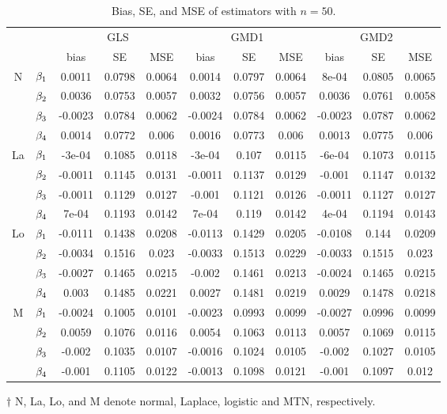 \begin{table}[htbp!]
\begin{center}
\begin{tabular}{c  c c c  c c c  c c c  c }
\hline
 &  & \multicolumn{3}{c}{GLS} & \multicolumn{3}{c}{GMD1} & \multicolumn{3}{c}{GMD2} \\
\cline{3-11}
 &  &  bias & SE & MSE & bias  & SE & MSE & bias & SE & MSE\\
\hline
\multirow{3}{*}{N}& $\beta_{1}$&0.0011  &0.0798 &0.0064 &0.0014  &0.0797 &0.0064 &8e-04   &0.0805 &0.0065 \\
& $\beta_{2}$&0.0036  &0.0753 &0.0057 &0.0032  &0.0756 &0.0057 &0.0036  &0.0761 &0.0058 \\
& $\beta_{3}$&-0.0023 &0.0784 &0.0062 &-0.0024 &0.0784 &0.0062 &-0.0023 &0.0787 &0.0062 \\
& $\beta_{4}$&0.0014  &0.0772 &0.006  &0.0016  &0.0773 &0.006  &0.0013  &0.0775 &0.006  \\
\hline
\multirow{3}{*}{La} &$\beta_{1}$&-3e-04  &0.1085 &0.0118 &-3e-04  &0.107  &0.0115 &-6e-04  &0.1073 &0.0115\\
&$\beta_{2}$&-0.0011 &0.1145 &0.0131 &-0.0011 &0.1137 &0.0129 &-0.001  &0.1147 &0.0132\\
&$\beta_{3}$&-0.0011 &0.1129 &0.0127 &-0.001  &0.1121 &0.0126 &-0.0011 &0.1127 &0.0127 \\
&$\beta_{4}$&7e-04   &0.1193 &0.0142 &7e-04   &0.119  &0.0142 &4e-04   &0.1194 &0.0143 \\
\hline
\multirow{3}{*}{Lo} &$\beta_{1}$&-0.0111 &0.1438 &0.0208 &-0.0113 &0.1429 &0.0205 &-0.0108 &0.144  &0.0209\\
&$\beta_{2}$&-0.0034 &0.1516 &0.023  &-0.0033 &0.1513 &0.0229 &-0.0033 &0.1515 &0.023\\
&$\beta_{3}$&-0.0027 &0.1465 &0.0215 &-0.002  &0.1461 &0.0213 &-0.0024 &0.1465 &0.0215 \\
&$\beta_{4}$&0.003   &0.1485 &0.0221 &0.0027  &0.1481 &0.0219 &0.0029  &0.1478 &0.0218 \\
\hline
\multirow{3}{*}{M}  &$\beta_{1}$&-0.0024 &0.1005 &0.0101 &-0.0023 &0.0993 &0.0099 &-0.0027 &0.0996 &0.0099\\
&$\beta_{2}$&0.0059  &0.1076 &0.0116 &0.0054  &0.1063 &0.0113 &0.0057  &0.1069 &0.0115\\
&$\beta_{3}$&-0.002  &0.1035 &0.0107 &-0.0016 &0.1024 &0.0105 &-0.002  &0.1027 &0.0105 \\
&$\beta_{4}$&-0.001  &0.1105 &0.0122 &-0.0013 &0.1098 &0.0121 &-0.001  &0.1097 &0.012  \\
\hline
\end{tabular}
\end{center}
\begin{tablenotes}
      \tiny
      \item $\dagger$ N, La, Lo, and M denote normal, Laplace, logistic and MTN, respectively.
\end{tablenotes}
\caption{Bias, SE, and MSE of estimators with $n=50$.}
\end{table}


